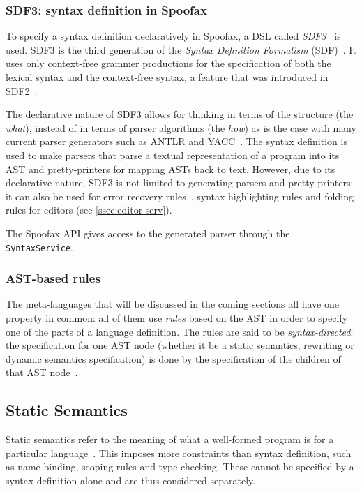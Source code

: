 \subsubsection{SDF3: syntax definition in Spoofax}
\label{ssec:orgheadline1}
To specify a syntax definition declaratively in Spoofax, a DSL called
\emph{SDF3}~\cite{Vollebregt12} is used.  SDF3 is the third generation
of the \emph{Syntax Definition Formalism} (SDF)~\cite{Heering89}. It
uses only context-free grammer productions for the specification of
both the lexical syntax and the context-free syntax, a feature that
was introduced in SDF2~\cite{Visser97}.

The declarative nature of SDF3 allows for thinking in terms of the
structure (the \emph{what}), instead of in terms of parser algorithms (the
\emph{how}) as is the case with many current parser generators such as
ANTLR and YACC~\cite{Kats10b}. The syntax definition is used to
make parsers that parse a textual representation of a program into its
AST and pretty-printers for mapping ASTs back to text. However, due to
its declarative nature, SDF3 is not limited to generating parsers and
pretty printers: it can also be used for error recovery
rules~\cite{deJonge12}, syntax highlighting rules and folding
rules for editors (see \cref{ssec:editor-serv}).

The Spoofax API gives access to the generated parser through the
\texttt{SyntaxService}.

\subsubsection{AST-based rules}
\label{ssec:orgheadline2}
The meta-languages that will be discussed in the coming sections all
have one property in common: all of them use \emph{rules} based on the AST
in order to specify one of the parts of a language definition. The
rules are said to be \emph{syntax-directed}: the specification for one AST
node (whether it be a static semantics, rewriting or dynamic semantics
specification) is done by the specification of the children of that
AST node~\cite{Winskel93}.

\subsection{Static Semantics}
\label{ssec:static-analysis}
Static semantics refer to the meaning of what a well-formed program is
for a particular language~\cite{Milner97}. This imposes more
constraints than syntax definition, such as name binding, scoping
rules and type checking. These cannot be specified by a syntax
definition alone and are thus considered separately.

